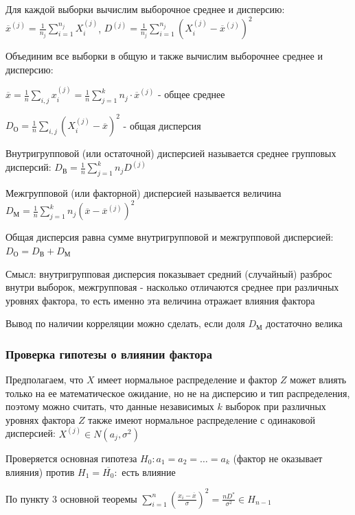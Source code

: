\documentclass[12pt]{article}
\begin{document}
Для каждой выборки вычислим выборочное среднее и дисперсию: $\overline{x}^{(j)} = \frac{1}{n_j} \sum_{i = 1}^{n_j} X_i^{(j)}$, 
$D^{(j)} = \frac{1}{n_j} \sum_{i = 1}^{n_j} (X_i^{(j)} - \overline{x}^{(j)})^2$

Объединим все выборки в общую и также вычислим выборочнее среднее и дисперсию: 

$\overline{x} = \frac{1}{n} \sum_{i, j} x^{(j)}_i = \frac{1}{n} \sum_{j = 1}^k n_j \cdot \overline{x}^{(j)}$ - общее среднее

$D_\text{О} = \frac{1}{n} \sum_{i, j} (X^{(j)}_i - \overline{x})^2$ - общая дисперсия

\Def Внутригрупповой (или остаточной) дисперсией называется среднее групповых дисперсий: $D_{\text{В}} = \frac{1}{n} \sum_{j = 1}^k n_j D^{(j)}$

\Def Межгрупповой (или факторной) дисперсией называется величина $D_{\text{М}} = \frac{1}{n} \sum_{j = 1}^k n_j (\overline{x} - \overline{x}^{(j)})^2$

\begin{MyTheorem}
     Общая дисперсия равна сумме внутригрупповой и межгрупповой дисперсией: $D_\text{О} = D_\text{В} + D_\text{М}$
\end{MyTheorem}

Смысл: внутригрупповая дисперсия показывает средний (случайный) разброс внутри выборок, межгрупповая - насколько отличаются среднее при различных 
уровнях фактора, то есть именно эта величина отражает влияния фактора

Вывод по наличии корреляции можно сделать, если доля $D_\text{М}$ достаточно велика

\subsubsection{Проверка гипотезы о влиянии фактора}

Предполагаем, что $X$ имеет нормальное распределение и фактор $Z$ может влиять только на ее математическое ожидание, 
но не на дисперсию и тип распределения, поэтому можно считать, что данные независимых $k$ выборок при различных уровнях фактора $Z$
также имеют нормальное распределение с одинаковой дисперсией: $X^{(j)} \in N(a_j, \sigma^2)$

Проверяется основная гипотеза $H_0 : a_1 = a_2 = \dots = a_k$ (фактор не оказывает влияния) против $H_1 = \overline{H_0} : $ есть влияние

По пункту 3 основной теоремы $\sum_{i = 1}^n \left(\frac{x_i - \overline{x}}{\sigma}\right)^2 = \frac{n D^*}{\sigma^2} \in H_{n - 1}$
\end{document}
